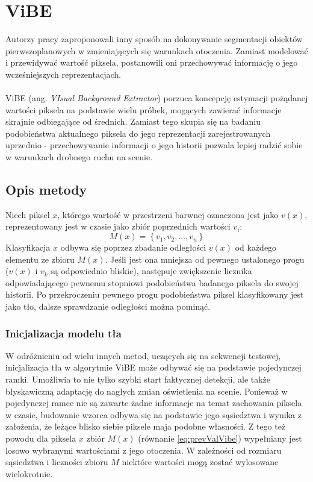 \section{ViBE}
Autorzy pracy \citep{barnich2011vibe} zaproponowali inny sposób na dokonywanie segmentacji obiektów pierwszoplanowych w zmieniających się warunkach otoczenia. Zamiast modelować i przewidywać wartość piksela, postanowili oni przechowywać informację o jego wcześniejszych reprezentacjach.
\paragraph{}
ViBE (ang. \textit{VIsual Background Extractor}) porzuca koncepcję estymacji pożądanej wartości piksela na podstawie wielu próbek, mogących zawierać informacje skrajnie odbiegające od średnich. Zamiast tego skupia się na badaniu podobieństwa aktualnego piksela do jego reprezentacji zarejestrowanych uprzednio - przechowywanie informacji o jego historii pozwala lepiej radzić sobie w warunkach drobnego ruchu na scenie.
\subsection{Opis metody}
Niech piksel $x$, którego wartość w przestrzeni barwnej oznaczona jest jako $v(x)$, reprezentowany jest w czasie jako zbiór poprzednich wartości $v_{i}$:
\begin{equation}
\label{eq:prevValVibe}
M(x) = \left\{v_{1}, v_{2}, ..., v_{n}\right\}
\end{equation}
Klasyfikacja $x$ odbywa się poprzez zbadanie odległości $v(x)$ od każdego elementu ze zbioru $M(x)$. Jeśli jest ona mniejsza od pewnego ustalonego progu ($v(x)$ i $v_{k}$ są odpowiednio bliskie), następuje zwiększenie licznika odpowiadającego pewnemu stopniowi podobieństwa badanego piksela do swojej historii. Po przekroczeniu pewnego progu podobieństwa piksel klasyfikowany jest jako tło, dalsze sprawdzanie odległości można pominąć.
\subsubsection{Inicjalizacja modelu tła}
W odróżnieniu od wielu innych metod, uczących się na sekwencji testowej, inicjalizacja tła w algorytmie ViBE może odbywać się na podstawie pojedynczej ramki. Umożliwia to nie tylko szybki start faktycznej detekcji, ale także błyskawiczną adaptację do nagłych zmian oświetlenia na scenie. Ponieważ w pojedynczej ramce nie są zawarte żadne informacje na temat zachowania piksela w czasie, budowanie wzorca odbywa się na podstawie jego sąsiedztwa i wynika z\,założenia, że leżące blisko siebie piksele maja podobne własności. Z tego też powodu dla piksela $x$ zbiór $M(x)$ (równanie \ref{eq:prevValVibe}) wypełniany jest losowo wybranymi wartościami z jego otoczenia. W zależności od rozmiaru sąsiedztwa i liczności zbioru $M$ niektóre wartości mogą zostać wylosowane wielokrotnie.
